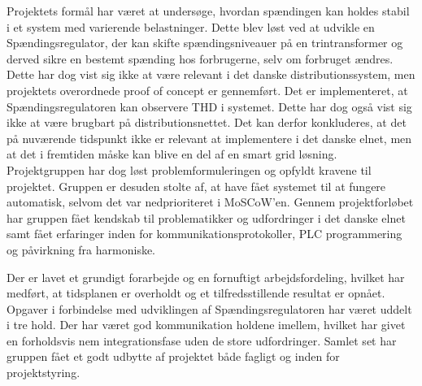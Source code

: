 

Projektets formål har været at undersøge, hvordan spændingen kan holdes stabil i et system med varierende belastninger. Dette blev løst ved at udvikle en Spændingsregulator, der kan skifte spændingsniveauer på en trintransformer og derved sikre en bestemt spænding hos forbrugerne, selv om forbruget ændres. Dette har dog vist sig ikke at være relevant i det danske distributionssystem, men projektets overordnede proof of concept er gennemført. Det er implementeret, at Spændingsregulatoren kan observere THD i systemet. Dette har dog også vist sig ikke at være brugbart på distributionsnettet. Det kan derfor konkluderes, at det på nuværende tidspunkt ikke er relevant at implementere i det danske elnet, men at det i fremtiden måske kan blive en del af en smart grid løsning. Projektgruppen har dog løst problemformuleringen og opfyldt kravene til projektet. Gruppen er desuden stolte af, at have fået systemet til at fungere automatisk, selvom det var nedprioriteret i MoSCoW'en. Gennem projektforløbet har gruppen fået kendskab til problematikker og udfordringer i det danske elnet samt fået erfaringer inden for kommunikationsprotokoller, PLC programmering og påvirkning fra harmoniske.  


Der er lavet et grundigt forarbejde og en fornuftigt arbejdsfordeling, hvilket har medført, at tidsplanen er overholdt og et tilfredsstillende resultat er opnået. Opgaver i forbindelse med udviklingen af Spændingsregulatoren har været uddelt i tre hold. Der har været god kommunikation holdene imellem, hvilket har givet en forholdsvis nem integrationsfase uden de store udfordringer. Samlet set har gruppen fået et godt udbytte af projektet både fagligt og inden for projektstyring.



 